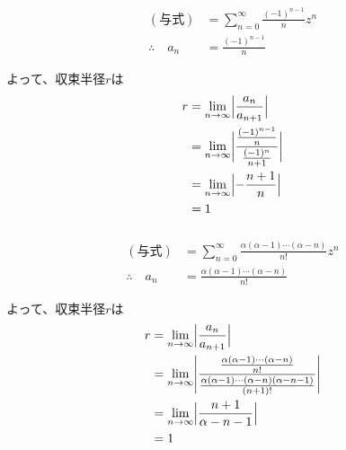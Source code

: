 \documentclass[dvipdfmx,a4paper]{jsarticle}
\begin{document}
\subsubsection{}
\begin{align*}
(与式) &= \sum_{n=0}^{\infty}\frac{(-1)^{n-1}}{n}z^n\\
\therefore\quad
a_n &= \frac{(-1)^{n-1}}{n}
\end{align*}

よって、収束半径$r$は
\begin{align*}
r &= \lim_{n \to \infty}\Bigl|\frac{a_n}{a_{n+1}}\Bigr|\\
&= \lim_{n \to \infty}\biggl|\frac{\frac{(-1)^{n-1}}{n}}{\frac{(-1)^{n}}{n+1}}\biggr|\\
&= \lim_{n \to \infty}\Bigl|-\frac{n+1}{n}\Bigr|\\
&= 1
\end{align*}

\subsubsection{}
\begin{align*}
(与式) &= \sum_{n=0}^{\infty}\frac{\alpha(\alpha-1)\cdots(\alpha-n)}{n!}z^n\\
\therefore\quad
a_n &= \frac{\alpha(\alpha-1)\cdots(\alpha-n)}{n!}
\end{align*}

よって、収束半径$r$は
\begin{align*}
r &= \lim_{n \to \infty}\Bigl|\frac{a_n}{a_{n+1}}\Bigr|\\
&= \lim_{n \to \infty}\Biggl|\frac{\frac{\alpha(\alpha-1)\cdots(\alpha-n)}{n!}}{\frac{\alpha(\alpha-1)\cdots(\alpha-n)(\alpha-n-1)}{(n+1)!}}\Biggr|\\
&= \lim_{n \to \infty}\Bigl|\frac{n+1}{\alpha-n-1}\Bigr|\\
&= 1
\end{align*}
\end{document}
